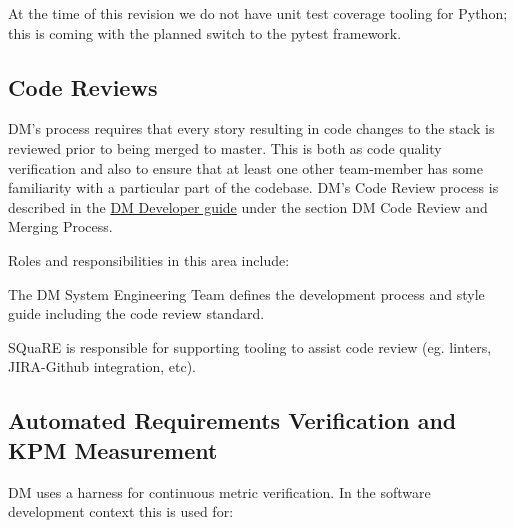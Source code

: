 At the time of this revision we do not have unit test coverage tooling for Python; this is coming with the planned switch to the pytest framework.

\subsection{Code Reviews}

DM’s process requires that every story resulting in code changes to the stack is reviewed prior to being merged to master. This is both as code quality verification and also to ensure that at least one other team-member has some familiarity with a particular part of the codebase. DM’s Code Review process is described in the \href{https://developer.lsst.io}{DM Developer guide} under the section DM Code Review and Merging Process.

Roles and responsibilities in this area include:

\begin{itemize_single}

\item The DM System Engineering Team  defines the development process and style guide including the code review standard.

\item SQuaRE is responsible for supporting tooling to assist code review (eg. linters, JIRA-Github integration, etc).

\end{itemize_single}

\subsection{Automated Requirements Verification and KPM Measurement}

DM uses a harness for continuous metric verification. In the software development context this is used for:

